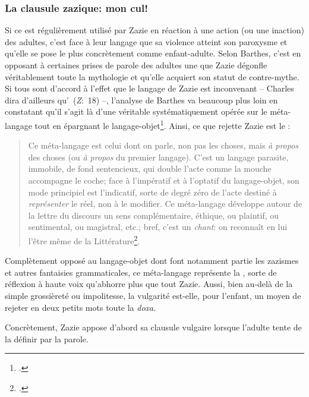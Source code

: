 \subsubsection{La clausule zazique: mon cul!}
Si ce  est régulièrement utilisé par Zazie en réaction à une action (ou une inaction) des adultes, c'est face à leur langage que sa violence atteint son paroxysme et qu'elle se pose le plus concrètement comme enfant-adulte.
Selon Barthes, c'est en opposant à certaines prises de parole des adultes une  que Zazie dégonfle véritablement toute la mythologie et qu'elle acquiert son statut de contre-mythe.
Si tous sont d'accord à l'effet que le langage de Zazie est inconvenant -- Charles dira d'ailleurs qu'~(\textit{Z}:~18) --, l'analyse de Barthes va beaucoup plus loin en constatant qu'il s'agit là d'une véritable  systématiquement opérée sur le méta-langage tout en épargnant le langage-objet\footcite[128]{Barthes1964}. Ainsi, ce que rejette Zazie est le :
\begin{quote}
  \begin{singlespace}
    \small
    Ce méta-langage est celui dont on parle, non pas les choses, mais \textit{à propos} des choses (ou \textit{à propos} du premier langage). C'est un langage parasite, immobile, de fond sentencieux, qui double l'acte comme la mouche accompagne le coche; face à l'impératif et à l'optatif du langage-objet, son mode principiel est l'indicatif, sorte de degré zéro de l'acte destiné à \textit{représenter} le réel, non à le modifier. Ce méta-langage développe autour de la lettre du discours un sens complémentaire, éthique, ou plaintif, ou sentimental, ou magistral, etc.; bref, c'est un \textit{chant}: on reconnaît en lui l'être même de la Littérature\footcite[128]{Barthes1964}.
    \normalsize
  \end{singlespace}
\end{quote}
Complètement opposé au langage-objet dont font notamment partie les zazismes et autres fantaisies grammaticales, ce méta-langage représente la , sorte de réflexion à haute voix qu'abhorre plus que tout Zazie.
Aussi, bien au-delà de la simple grossièreté ou impolitesse, la vulgarité est-elle, pour l'enfant, un moyen de rejeter en deux petits mots toute la \textit{doxa}.
\par
Concrètement, Zazie appose d'abord sa clausule vulgaire lorsque l'adulte tente de la définir par la parole.
